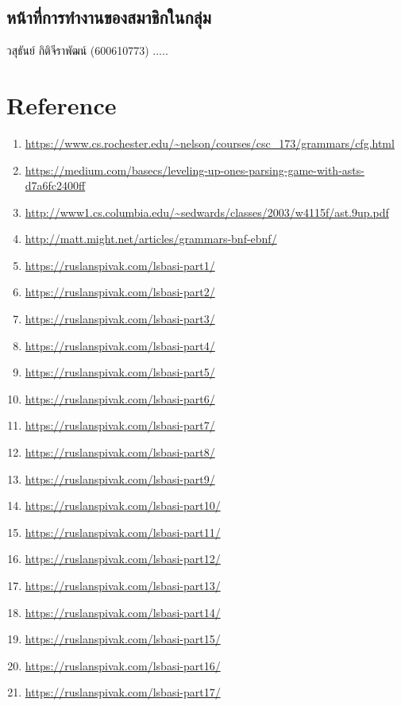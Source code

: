 \documentclass[14pt]{article}
\begin{document}
\subsection{หน้าที่การทำงานของสมาชิกในกลุ่ม}
วสุธันย์ กิติจีราพัฒน์ (600610773) ..... 
\section{Reference}
\begin{enumerate}
\item\url{https://www.cs.rochester.edu/~nelson/courses/csc_173/grammars/cfg.html}
\item\url{https://medium.com/basecs/leveling-up-ones-parsing-game-with-asts-d7a6fc2400ff}
\item\url{http://www1.cs.columbia.edu/~sedwards/classes/2003/w4115f/ast.9up.pdf}
\item\url{http://matt.might.net/articles/grammars-bnf-ebnf/}
\item\url{https://ruslanspivak.com/lsbasi-part1/}
\item\url{https://ruslanspivak.com/lsbasi-part2/}
\item\url{https://ruslanspivak.com/lsbasi-part3/}
\item\url{https://ruslanspivak.com/lsbasi-part4/}
\item\url{https://ruslanspivak.com/lsbasi-part5/}
\item\url{https://ruslanspivak.com/lsbasi-part6/}
\item\url{https://ruslanspivak.com/lsbasi-part7/}
\item\url{https://ruslanspivak.com/lsbasi-part8/}
\item\url{https://ruslanspivak.com/lsbasi-part9/}
\item\url{https://ruslanspivak.com/lsbasi-part10/}
\item\url{https://ruslanspivak.com/lsbasi-part11/}
\item\url{https://ruslanspivak.com/lsbasi-part12/}
\item\url{https://ruslanspivak.com/lsbasi-part13/}
\item\url{https://ruslanspivak.com/lsbasi-part14/}
\item\url{https://ruslanspivak.com/lsbasi-part15/}
\item\url{https://ruslanspivak.com/lsbasi-part16/}
\item\url{https://ruslanspivak.com/lsbasi-part17/}
\end{enumerate}
\end{document}
